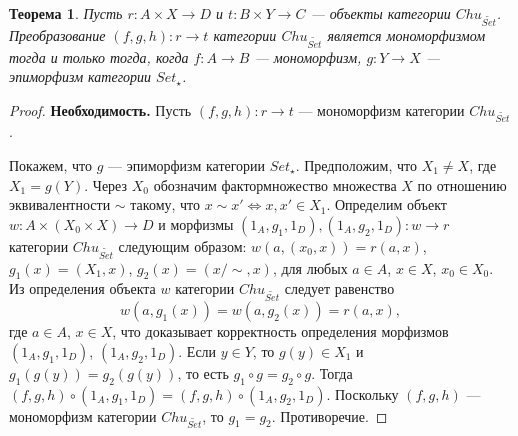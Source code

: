 \documentclass[a4paper,12pt]{article}
\newtheorem{theorem}{Теорема}
\begin{document}
\begin{theorem}\label{monomorphism}
    Пусть $r: A \times X \to D$ и $t: B \times Y \to C$ --- объекты категории $Chu_{\widetilde{Set}}$. Преобразование $(f,g,h): r \to t$ категории $Chu_{\widetilde{Set}}$ является мономорфизмом тогда и только тогда, когда $f: A \to B$ --- мономорфизм, $g: Y \to X$ --- эпиморфизм категории $Set_{\star}$.
\end{theorem}
\begin{proof}
    \textbf{Необходимость.} Пусть $(f,g,h): r \to t$ --- мономорфизм категории $Chu_{\widetilde{Set}}$.

    Покажем, что $g$ --- эпиморфизм категории $Set_{\star}$. Предположим, что $X_1 \ne X$, где $X_1 = g(Y)$. Через $X_0$ обозначим фактормножество множества $X$ по отношению эквивалентности $\sim$ такому, что $x \sim x' \Leftrightarrow x,x' \in X_1$. Определим объект $w: A \times (X_0 \times X) \to D$ и морфизмы $(1_A,g_1,1_D), (1_A,g_2,1_D): w \to r$ категории $Chu_{\widetilde{Set}}$ следующим образом: $w(a,(x_0,x)) = r(a,x)$, $g_1(x) = (X_1,x)$, $g_2(x) = (x/\sim, x)$, для любых $a \in A$, $x \in X$, $x_0 \in X_0$. Из определения объекта $w$ категории $Chu_{\widetilde{Set}}$ следует равенство
    $$
        w(a,g_1(x)) = w(a,g_2(x)) = r(a,x),
    $$ 
    где $a \in A$, $x \in X$, что доказывает корректность определения морфизмов $(1_A,g_1,1_D)$, $(1_A,g_2,1_D)$. Если $y \in Y$, то $g(y) \in X_1$ и $g_1(g(y)) = g_2(g(y))$, то есть $g_1 \circ g = g_2 \circ g$. Тогда $(f,g,h) \circ (1_A,g_1,1_D) = (f,g,h) \circ (1_A,g_2,1_D)$. Поскольку $(f,g,h)$ --- мономорфизм категории $Chu_{\widetilde{Set}}$, то $g_1 = g_2$. Противоречие.


\end{proof}
\end{document}
